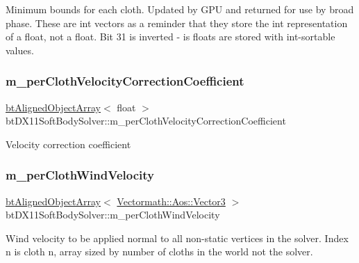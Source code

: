 Minimum bounds for each cloth. Updated by G\+PU and returned for use by broad phase. These are int vectors as a reminder that they store the int representation of a float, not a float. Bit 31 is inverted -\/ is floats are stored with int-\/sortable values. \mbox{\label{classbtDX11SoftBodySolver_ada99231e53db3fad0b91154fbc14e867}} 
\subsubsection{\texorpdfstring{m\+\_\+per\+Cloth\+Velocity\+Correction\+Coefficient}{m\_perClothVelocityCorrectionCoefficient}}
{\footnotesize\ttfamily \hyperlink{classbtAlignedObjectArray}{bt\+Aligned\+Object\+Array}$<$ float $>$ bt\+D\+X11\+Soft\+Body\+Solver\+::m\+\_\+per\+Cloth\+Velocity\+Correction\+Coefficient\hspace{0.3cm}{\ttfamily [protected]}}

Velocity correction coefficient \mbox{\label{classbtDX11SoftBodySolver_a987c1c220a3f6c88c67bf2c1d781f3e6}} 
\subsubsection{\texorpdfstring{m\+\_\+per\+Cloth\+Wind\+Velocity}{m\_perClothWindVelocity}}
{\footnotesize\ttfamily \hyperlink{classbtAlignedObjectArray}{bt\+Aligned\+Object\+Array}$<$ \hyperlink{classVectormath_1_1Aos_1_1Vector3}{Vectormath\+::\+Aos\+::\+Vector3} $>$ bt\+D\+X11\+Soft\+Body\+Solver\+::m\+\_\+per\+Cloth\+Wind\+Velocity\hspace{0.3cm}{\ttfamily [protected]}}

Wind velocity to be applied normal to all non-\/static vertices in the solver. Index n is cloth n, array sized by number of cloths in the world not the solver. \mbox{\label{classbtDX11SoftBodySolver_aa7f958873014d55c566a9040f585b415}} 
